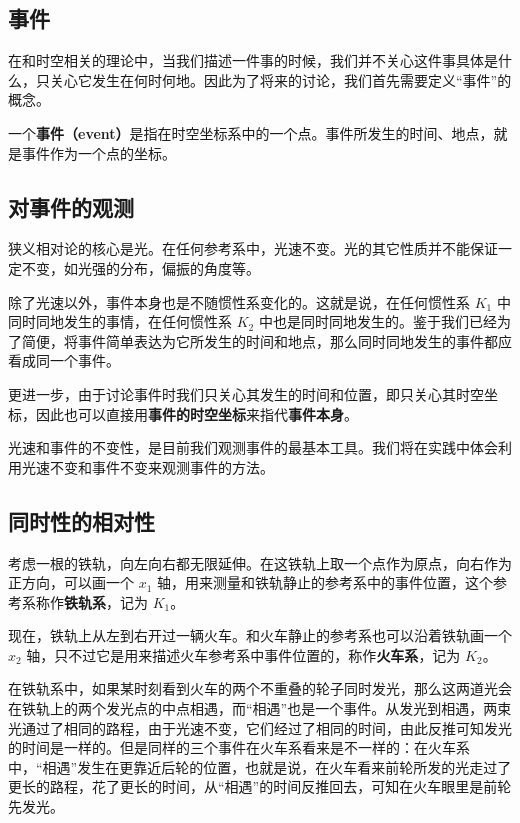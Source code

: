 

\subsection{事件}

在和时空相关的理论中，当我们描述一件事的时候，我们并不关心这件事具体是什么，只关心它发生在何时何地。因此为了将来的讨论，我们首先需要定义“事件”的概念。

一个\textbf{事件（event）}是指在时空坐标系中的一个点。事件所发生的时间、地点，就是事件作为一个点的坐标。

\subsection{对事件的观测}

狭义相对论的核心是光。在任何参考系中，光速不变。光的其它性质并不能保证一定不变，如光强的分布，偏振的角度等。

除了光速以外，事件本身也是不随惯性系变化的。这就是说，在任何惯性系 $K_1$ 中同时同地发生的事情，在任何惯性系 $K_2$ 中也是同时同地发生的。鉴于我们已经为了简便，将事件简单表达为它所发生的时间和地点，那么同时同地发生的事件都应看成同一个事件。

更进一步，由于讨论事件时我们只关心其发生的时间和位置，即只关心其时空坐标，因此也可以直接用\textbf{事件的时空坐标}来指代\textbf{事件本身}。

光速和事件的不变性，是目前我们观测事件的最基本工具。我们将在实践中体会利用光速不变和事件不变来观测事件的方法。

\subsection{同时性的相对性}

考虑一根的铁轨，向左向右都无限延伸。在这铁轨上取一个点作为原点，向右作为正方向，可以画一个 $x_1$ 轴，用来测量和铁轨静止的参考系中的事件位置，这个参考系称作\textbf{铁轨系}，记为 $K_1$。

现在，铁轨上从左到右开过一辆火车。和火车静止的参考系也可以沿着铁轨画一个 $x_2$ 轴，只不过它是用来描述火车参考系中事件位置的，称作\textbf{火车系}，记为 $K_2$。

在铁轨系中，如果某时刻看到火车的两个不重叠的轮子同时发光，那么这两道光会在铁轨上的两个发光点的中点相遇，而“相遇”也是一个事件。从发光到相遇，两束光通过了相同的路程，由于光速不变，它们经过了相同的时间，由此反推可知发光的时间是一样的。但是同样的三个事件在火车系看来是不一样的：在火车系中，“相遇”发生在更靠近后轮的位置，也就是说，在火车看来前轮所发的光走过了更长的路程，花了更长的时间，从“相遇”的时间反推回去，可知在火车眼里是前轮先发光。

